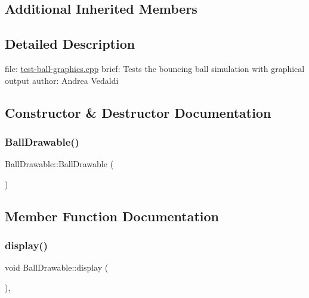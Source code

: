 \subsection*{Additional Inherited Members}


\subsection{Detailed Description}
file\+: \hyperlink{test-ball-graphics_8cpp}{test-\/ball-\/graphics.\+cpp} brief\+: Tests the bouncing ball simulation with graphical output author\+: Andrea Vedaldi 

\subsection{Constructor \& Destructor Documentation}
\mbox{\label{classBallDrawable_a50bda55f52c2ddbdf2bba8dde1471957}} 
\subsubsection{\texorpdfstring{Ball\+Drawable()}{BallDrawable()}}
{\footnotesize\ttfamily Ball\+Drawable\+::\+Ball\+Drawable (\begin{DoxyParamCaption}{ }\end{DoxyParamCaption})\hspace{0.3cm}{\ttfamily [inline]}}



\subsection{Member Function Documentation}
\mbox{\label{classBallDrawable_a934809e648474de989666d41a34a880e}} 
\subsubsection{\texorpdfstring{display()}{display()}}
{\footnotesize\ttfamily void Ball\+Drawable\+::display (\begin{DoxyParamCaption}{ }\end{DoxyParamCaption})\hspace{0.3cm}{\ttfamily [inline]}, {\ttfamily [virtual]}}



